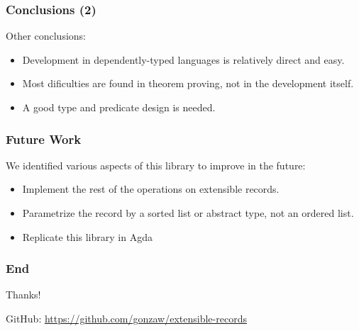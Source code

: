 \documentclass{beamer}
\begin{document}
\begin{frame}
\frametitle{Conclusions (2)}

Other conclusions:

\begin{itemize}
\item Development in dependently-typed languages is relatively direct and easy.
\item Most dificulties are found in theorem proving, not in the development itself.
\item A good type and predicate design is needed.
\end{itemize}

\end{frame}

\begin{frame}
\frametitle{Future Work}

We identified various aspects of this library to improve in the future:

\begin{itemize}
\item Implement the rest of the operations on extensible records.
\item Parametrize the record by a sorted list or abstract type, not an ordered list.
\item Replicate this library in Agda
\end{itemize}

\end{frame}

\begin{frame}
\frametitle{End}

\begin{center}
{\huge Thanks!}
\end{center}

\vfill

\vfill

\begin{center}
GitHub: \url{https://github.com/gonzaw/extensible-records}
\end{center}

\end{frame}
\end{document}
